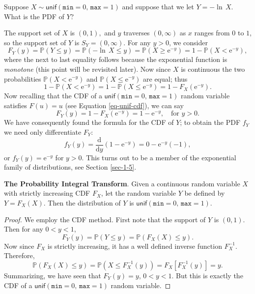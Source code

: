 \documentclass[captions=tableheading]{scrbook}
\begin{document}
\begin{example}
Suppose \(X\sim\mathsf{unif}(\mathtt{min}=0,\,\mathtt{max}=1)\) and
suppose that we let \(Y=-\ln\, X\). What is the PDF of \(Y\)?

The support set of \(X\) is \((0,1),\) and \(y\) traverses \((0,\infty)\) as \(x\) ranges from \(0\) to \(1\), so the support set of \(Y\) is \(S_{Y}=(0,\infty)\). For any \(y>0\), we consider
\[
F_{Y}(y)=\mathbb{P}(Y\leq y)=\mathbb{P}(-\ln\, X\leq y)=\mathbb{P}(X\geq\mathrm{e}^{-y})=1-\mathbb{P}(X<\mathrm{e}^{-y}),
\]
where the next to last equality follows because the exponential function is \emph{monotone} (this point will be revisited later). Now since \(X\) is continuous the two probabilities \(\mathbb{P}(X<\mathrm{e}^{-y})\) and \(\mathbb{P}(X\leq\mathrm{e}^{-y})\) are equal; thus
\[
1-\mathbb{P}(X < \mathrm{e}^{-y})=1-\mathbb{P}(X\leq\mathrm{e}^{-y})=1-F_{X}(\mathrm{e}^{-y}).
\]
Now recalling that the CDF of a \(\mathsf{unif}(\mathtt{min}=0,\,\mathtt{max}=1)\) random variable satisfies \(F(u)=u\) (see Equation \ref{eq-unif-cdf}), we can say
\[
F_{Y}(y)=1-F_{X}(\mathrm{e}^{-y})=1-\mathrm{e}^{-y},\quad\mbox{for }y>0.
\]
We have consequently found the formula for the CDF of \(Y\); to obtain the PDF \(f_{Y}\) we need only differentiate \(F_{Y}\):
\[
f_{Y}(y)=\frac{\mathrm{d}}{\mathrm{d} y}\left(1-\mathrm{e}^{-y}\right)=0-\mathrm{e}^{-y}(-1),
\]
or \(f_{Y}(y)=\mathrm{e}^{-y}\) for \(y>0\). This turns out to be a member of the exponential family of distributions, see Section \ref{sec-1-5}. 
\end{example}

\begin{example}
\textbf{The Probability Integral Transform}. Given a continuous random variable \(X\) with strictly increasing CDF \(F_{X}\), let the random variable \(Y\) be defined by \(Y=F_{X}(X)\). Then the distribution of \(Y\) is \(\mathsf{unif}(\mathtt{min}=0,\,\mathtt{max}=1)\).
\end{example}

\begin{proof}
We employ the CDF method. First note that the support of \(Y\) is \((0,1)\). Then for any \(0<y<1\),
\[
F_{Y}(y)=\mathbb{P}(Y\leq y)=\mathbb{P}(F_{X}(X)\leq y).
\]
Now since \(F_{X}\) is strictly increasing, it has a well defined inverse function \(F_{X}^{-1}\). Therefore,
\[
\mathbb{P}(F_{X}(X)\leq y)=\mathbb{P}(X\leq F_{X}^{-1}(y))=F_{X}[F_{X}^{-1}(y)]=y.
\]
Summarizing, we have seen that \(F_{Y}(y)=y\), \(0<y<1\). But this is exactly the CDF of a \(\mathsf{unif}(\mathtt{min}=0,\,\mathtt{max}=1)\) random variable. 
\end{proof}
\end{document}
